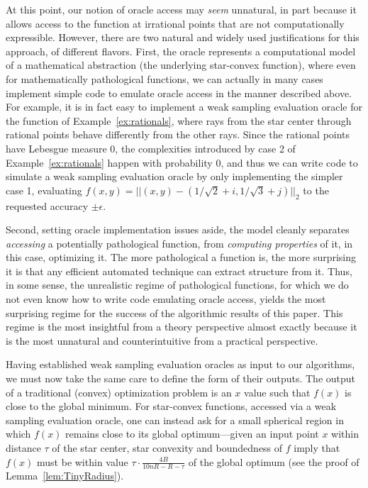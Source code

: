 \documentclass[11pt,letter]{article}
\newcommand{\ferr}{\epsilon}
\numberwithin{nTheorems}{section}
\begin{document}
At this point, our notion of oracle access may \emph{seem} unnatural, in part because it allows access to the function at irrational points that are not computationally expressible.
However, there are two natural and widely used justifications for this approach, of different flavors.
First, the oracle represents a computational model of a mathematical abstraction (the underlying star-convex function), where even for mathematically pathological functions, we can actually in many cases implement simple code to emulate oracle access in the manner described above.
For example, it is in fact easy to implement a weak sampling evaluation oracle for the function of Example~\ref{ex:rationals}, where rays from the star center through rational points behave differently from the other rays.
Since the rational points have Lebesgue measure 0, the complexities introduced by case 2 of Example~\ref{ex:rationals} happen with probability 0, and thus we can write code to simulate a weak sampling evaluation oracle by only implementing the simpler case 1, evaluating $f(x,y)=||(x,y)-(1/\sqrt{2}+i,1/\sqrt{3}+j)||_2$ to the requested accuracy $\pm \ferr$.




Second, setting oracle implementation issues aside, the model cleanly separates \emph{accessing} a potentially pathological function, from \emph{computing properties} of it, in this case, optimizing it. The more pathological a function is, the more surprising it is that any efficient automated technique can extract structure from it. Thus, in some sense, the unrealistic regime of pathological functions, for which we do not even know how to write code emulating oracle access, yields the most surprising regime for the success of the algorithmic results of this paper. This regime is the most insightful from a theory perspective almost exactly because it is the most unnatural and counterintuitive from a practical perspective.





Having established weak sampling evaluation oracles as input to our algorithms, we must now take the same care to define the form of their outputs.
The output of a traditional (convex) optimization problem is an $x$ value such that $f(x)$ is close to the global minimum. For star-convex functions, accessed via a weak sampling evaluation oracle, one can instead ask for a small spherical region in which $f(x)$ remains close to its global optimum---given an input point $x$ within distance $\tau$ of the star center, star convexity and boundedness of $f$ imply that $f(x)$ must be within value $\tau\cdot\frac{4B}{10nR-R-\tau}$ of the global optimum (see the proof of Lemma~\ref{lem:TinyRadius}).
\end{document}
